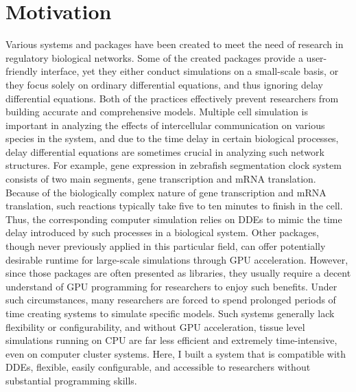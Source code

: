 \documentclass[../thesis.tex]{subfiles}
\begin{document}
\section{Motivation}
Various systems and packages have been created to meet the need of research in regulatory biological networks. Some of the created packages provide a user-friendly interface, yet they either conduct simulations on a small-scale basis, or they focus solely on ordinary differential equations, and thus ignoring delay differential equations. Both of the practices effectively prevent researchers from building accurate and comprehensive models. Multiple cell simulation is important in analyzing the effects of intercellular communication on various species in the system, and due to the time delay in certain biological processes, delay differential equations are sometimes crucial in analyzing such network structures. For example, gene expression in zebrafish segmentation clock system consists of two main segments, gene transcription and mRNA translation. Because of the biologically complex nature of gene transcription and mRNA translation, such reactions typically take five to ten minutes to finish in the cell. Thus, the corresponding computer simulation relies on DDEs to mimic the time delay introduced by such processes in a biological system. Other packages, though never previously applied in this particular field, can offer potentially desirable runtime for large-scale simulations through GPU acceleration. However, since those packages are often presented as libraries, they usually require a decent understand of GPU programming for researchers to enjoy such benefits. Under such circumstances, many researchers are forced to spend prolonged periods of time creating systems to simulate specific models. Such systems generally lack flexibility or configurability, and without GPU acceleration, tissue level simulations running on CPU are far less efficient and extremely time-intensive, even on computer cluster systems. Here, I built a system that is compatible with DDEs, flexible, easily configurable, and accessible to researchers without substantial programming skills.
\end{document}
